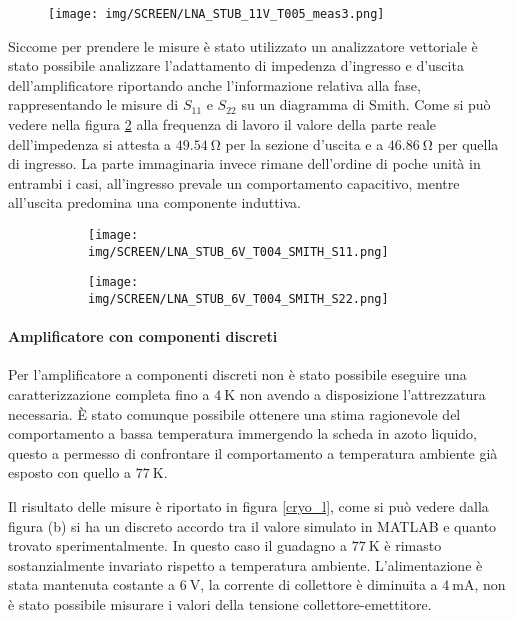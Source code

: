 \documentclass[12pt,oneside]{book}
\begin{document}
\begin{figure}[!htbp]
    \centering
        \texttt{[image: img/SCREEN/LNA\_STUB\_11V\_T005\_meas3.png]}
    \caption{}
    \label{cryo_stub_all}
\end{figure}

Siccome per prendere le misure è stato utilizzato un analizzatore vettoriale è stato possibile analizzare l'adattamento di impedenza d'ingresso e d'uscita dell'amplificatore riportando anche l'informazione relativa alla fase, rappresentando le misure di $S_{11}$ e $S_{22}$ su un diagramma di Smith.
Come si può vedere nella figura \ref{smith_plot_cryo} alla frequenza di lavoro il valore della parte reale dell'impedenza si attesta a $\SI{49.54}{\ohm}$ per la sezione d'uscita e a $\SI{46.86}{\ohm}$ per quella di ingresso. La parte immaginaria invece rimane dell'ordine di poche unità in entrambi i casi, all'ingresso prevale un comportamento capacitivo, mentre all'uscita predomina una componente induttiva.

\begin{figure}[!htbp]
    \centering
    \begin{subfigure}[t]{0.49\textwidth}
        \centering
        \texttt{[image: img/SCREEN/LNA\_STUB\_6V\_T004\_SMITH\_S11.png]}
        \caption{}
    \end{subfigure}
    \hfill
    \begin{subfigure}[t]{0.49\textwidth}
        \centering
        \texttt{[image: img/SCREEN/LNA\_STUB\_6V\_T004\_SMITH\_S22.png]}
        \caption{}
    \end{subfigure}
    \caption{}
    \label{smith_plot_cryo}
\end{figure}

\paragraph{Amplificatore con componenti discreti}

Per l'amplificatore a componenti discreti non è stato possibile eseguire una caratterizzazione completa fino a $\SI{4}{\kelvin}$ non avendo a disposizione l'attrezzatura necessaria. È stato comunque possibile ottenere una stima ragionevole del comportamento a bassa temperatura immergendo la scheda in azoto liquido, questo a permesso di confrontare il comportamento a temperatura ambiente già esposto con quello a $\SI{77}{\kelvin}$.

Il risultato delle misure è riportato in figura \ref{cryo_l}, come si può vedere dalla figura (b) si ha un discreto accordo tra il valore simulato in MATLAB e quanto trovato sperimentalmente. In questo caso il guadagno a $\SI{77}{\kelvin}$ è rimasto sostanzialmente invariato rispetto a temperatura ambiente. L'alimentazione è stata mantenuta costante a $\SI{6}{\volt}$, la corrente di collettore è diminuita a $\SI{4}{\milli\ampere}$, non è stato possibile misurare i valori della tensione collettore-emettitore.
\end{document}
